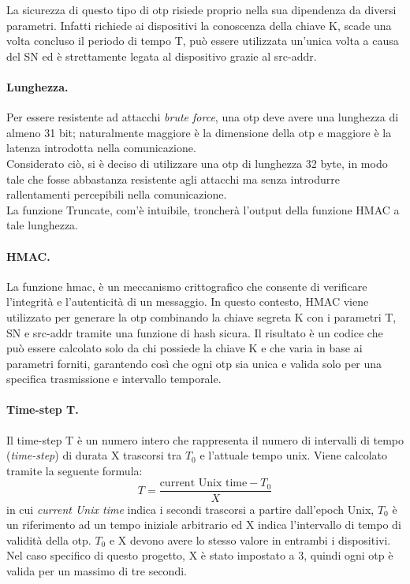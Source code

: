 La sicurezza di questo tipo di \gls{otp} risiede proprio nella sua dipendenza da diversi parametri. Infatti richiede ai dispositivi la conoscenza della chiave K, scade una volta concluso il periodo di tempo T, può essere utilizzata un'unica volta a causa del SN ed è strettamente legata al dispositivo grazie al src-addr.

\paragraph{Lunghezza.}
Per essere resistente ad attacchi \textit{brute force}, una \gls{otp} deve avere una lunghezza di almeno 31 bit; naturalmente maggiore è la dimensione della \gls{otp} e maggiore è la latenza introdotta nella comunicazione.\\
Considerato ciò, si è deciso di utilizzare una \gls{otp} di lunghezza 32 byte, in modo tale che fosse abbastanza resistente agli attacchi ma senza introdurre rallentamenti percepibili nella comunicazione.\\
La funzione Truncate, com'è intuibile, troncherà l'output della funzione HMAC a tale lunghezza.

\paragraph{HMAC.}
La funzione \gls{hmac}\glsfirstoccur, è un meccanismo crittografico che consente di verificare l'integrità e l'autenticità di un messaggio. In questo contesto, HMAC viene utilizzato per generare la \gls{otp} combinando la chiave segreta K con i parametri T, SN e src-addr tramite una funzione di hash sicura. Il risultato è un codice che può essere calcolato solo da chi possiede la chiave K e che varia in base ai parametri forniti, garantendo così che ogni \gls{otp} sia unica e valida solo per una specifica trasmissione e intervallo temporale.

\paragraph{Time-step T.}
Il time-step T è un numero intero che rappresenta il numero di intervalli di tempo (\textit{time-step}) di durata X trascorsi tra $T_0$ e l'attuale tempo unix. Viene calcolato tramite la seguente formula:
\begin{equation}
    T = \frac{\text{current Unix time} - T_0}{X}
    \label{eq:timestep}
\end{equation}
in cui \textit{current Unix time} indica i secondi trascorsi a partire dall'epoch Unix, $T_0$ è un riferimento ad un tempo iniziale arbitrario ed X indica l'intervallo di tempo di validità della \gls{otp}. $T_0$ e X devono avere lo stesso valore in entrambi i dispositivi.
Nel caso specifico di questo progetto, X è stato impostato a 3, quindi ogni \gls{otp} è valida per un massimo di tre secondi.

